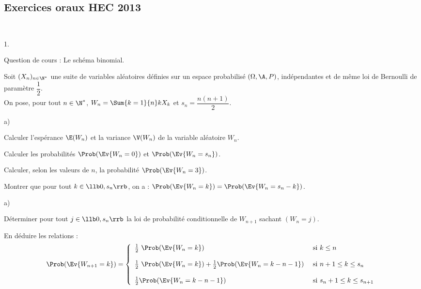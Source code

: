 \subsection*{Exercices oraux HEC 2013}


\begin{exerciceAP}~
  \begin{noliste}{1.}
    \setlength{\itemsep}{2mm}
  \item Question de cours : Le schéma binomial.
  \item Soit $(X_n)_{ n \in \N^* }$ une suite de variables aléatoires
    définies sur un espace probabilisé $(\Omega , \A , P )$,
    indépendantes et de même loi de Bernoulli de paramètre
    $\dfrac{1}{2}$.\\
    On pose, pour tout $n \in \N^*$, $W_n = \Sum{k=1}{n} k X_k$ et
    $s_n = \dfrac{n(n+1)}{2}$.
    \begin{noliste}{a)}
      \setlength{\itemsep}{2mm}
    \item Calculer l'espérance $\E(W_n)$ et la variance $\V(W_n)$ de
      la variable aléatoire $W_n$.
    \item Calculer les probabilités $\Prob(\Ev{W_n = 0})$ et
      $\Prob(\Ev{W_n = s_n})$.
    \item Calculer, selon les valeurs de $n$, la probabilité
      $\Prob(\Ev{W_n = 3})$.
    \end{noliste}

  \item Montrer que pour tout $k \in \llb 0, s_n \rrb$, on a :
    $\Prob(\Ev{W_n = k}) = \Prob(\Ev{W_n = s_n - k})$.

  \item 
    \begin{noliste}{a)}
      \setlength{\itemsep}{2mm}
    \item Déterminer pour tout $j \in \llb 0, s_n \rrb$ la loi de
      probabilité conditionnelle de $W_{n+1}$ sachant $(W_n = j)$.
    \item En déduire les relations :
      \[
      \Prob(\Ev{W_{n+1} = k}) = \left\{
        \begin{array}{ll} 
          \frac{ 1 }{ 2 } \ \Prob(\Ev{W_n = k}) & \text{ si } k \leq n \\ 
          \\ 
          \frac{ 1 }{ 2 } \ \Prob(\Ev{W_n = k}) + \frac{1}{2}
          \Prob(\Ev{W_n = k-n-1}) & \text{ si } n+1 \leq k \leq s_n \\ 
          \\
          \frac{1}{2} \Prob(\Ev{W_n = k-n-1}) & \text{ si } s_n + 1 \leq
          k \leq s_{n+1} 
        \end{array} 
      \right.
      \]
    \end{noliste}
  \end{noliste}
\end{exerciceAP} 


